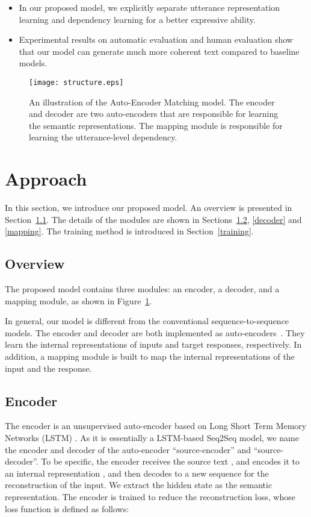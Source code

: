 \documentclass[11pt,a4paper]{article}
\begin{document}
\begin{CJK}{UTF8}{song}
\begin{itemize}
\item In our proposed model, we explicitly separate utterance representation learning and dependency learning for a better expressive ability.

\item Experimental results on automatic evaluation and human evaluation show that our model can generate much more coherent text compared to baseline models.


\end{itemize}

\begin{figure}[t] 
\centering
\texttt{[image: structure.eps]}
\caption{An illustration of the Auto-Encoder Matching model. The encoder and decoder are two auto-encoders that are responsible for learning the semantic representations. The mapping module is responsible for learning the utterance-level dependency. }
\label{structure} 
\end{figure} 


\section{Approach}
In this section, we introduce our proposed model. An overview is presented in Section~\ref{overview}. The details of the modules are shown in Sections~\ref{encoder}, \ref{decoder} and \ref{mapping}. The training method is introduced in Section~\ref{training}. 


\subsection{Overview}\label{overview}

The proposed model contains three modules: an encoder, a decoder, and a mapping module, as shown in Figure~\ref{structure}. 

In general, our model is different from the conventional sequence-to-sequence models. 
The encoder and decoder are both implemented as auto-encoders~\cite{DBLP:journals/jmlr/Baldi12}. They learn the internal representations of inputs and target responses, respectively.
In addition, a mapping module is built to map the internal representations of the input and the response.



\subsection{Encoder}\label{encoder}
The encoder  is an unsupervised auto-encoder based on Long Short Term Memory Networks (LSTM) \citep{lstm}. As it is essentially a LSTM-based Seq2Seq model, we name the encoder and decoder of the auto-encoder ``source-encoder'' and ``source-decoder''. To be specific, the encoder  receives the source text , and encodes it to an internal representation , and then decodes  to a new sequence  for the reconstruction of the input. We extract the hidden state  as the semantic representation. The encoder  is trained to reduce the reconstruction loss, whose loss function is defined as follows:


\end{CJK}
\end{document}
